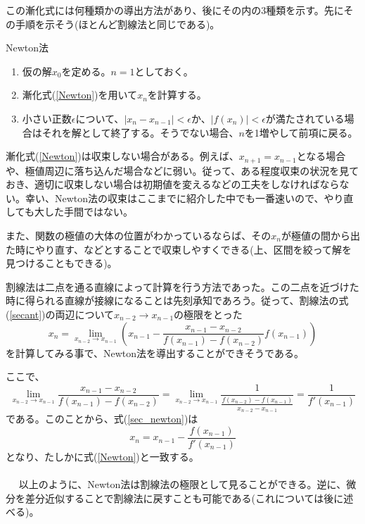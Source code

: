この漸化式には何種類かの導出方法があり、後にその内の3種類を示す。先にその手順を示そう(ほとんど割線法と同じである)。

\begin{itembox}[l]{Newton法}
\begin{enumerate}
\item 仮の解$x_0$を定める。$n=1$としておく。
\item 漸化式(\ref{Newton})を用いて$x_n$を計算する。
\item 小さい正数$\epsilon$について、$|x_{n}-x_{n-1}|<\epsilon$か、$|f(x_{n})|<\epsilon$が満たされている場合はそれを解として終了する。そうでない場合、$n$を1増やして前項に戻る。
\end{enumerate}
\end{itembox}

漸化式(\ref{Newton})は収束しない場合がある。例えば、$x_{n+1}=x_{n-1}$となる場合や、極値周辺に落ち込んだ場合などに弱い。従って、ある程度収束の状況を見ておき、適切に収束しない場合は初期値を変えるなどの工夫をしなければならない。幸い、Newton法の収束はここまでに紹介した中でも一番速いので、やり直しても大した手間ではない。

また、関数の極値の大体の位置がわかっているならば、その$x_n$が極値の間から出た時にやり直す、などとすることで収束しやすくできる(上、区間を絞って解を見つけることもできる)。

割線法は二点を通る直線によって計算を行う方法であった。この二点を近づけた時に得られる直線が接線になることは先刻承知であろう。従って、割線法の式(\ref{secant})の両辺について$x_{n-2}\rightarrow x_{n-1}$の極限をとった
\begin{equation}
x_n=\lim_{x_{n-2}\rightarrow x_{n-1}} \left(x_{n-1}-\frac{x_{n-1}-x_{n-2}}{f(x_{n-1})-f(x_{n-2})}f(x_{n-1})\right) \label{sec_newton}
\end{equation}
を計算してみる事で、Newton法を導出することができそうである。

ここで、
\begin{equation}
\lim_{x_{n-2}\rightarrow x_{n-1}} \frac{x_{n-1}-x_{n-2}}{f(x_{n-1})-f(x_{n-2})}=\lim_{x_{n-2}\rightarrow x_{n-1}} \frac{1}{\frac{f(x_{n-2})-f(x_{n-1})}{x_{n-2}-x_{n-1}}}=\frac{1}{f'(x_{n-1})}
\end{equation}
である。このことから、式(\ref{sec_newton})は
\begin{equation}
x_n=x_{n-1}-\frac{f(x_{n-1})}{f'(x_{n-1})}
\end{equation}
となり、たしかに式(\ref{Newton})と一致する。
\\ \\　
以上のように、Newton法は割線法の極限として見ることができる。逆に、微分を差分近似することで割線法に戻すことも可能である(これについては後に述べる)。

